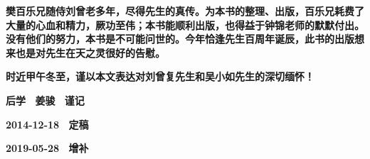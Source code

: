 \textbf{樊百乐兄随侍刘曾老多年，尽得先生的真传。为本书的整理、出版，百乐兄耗费了大量的心血和精力，厥功至伟；本书能顺利出版，也得益于钟锦老师的默默付出。没有他们的努力，本书是不可能问世的。今年恰逢先生百周年诞辰，此书的出版想来也是对先生在天之灵很好的告慰。}

\textbf{时近甲午冬至，谨以本文表达对刘曾复先生和吴小如先生的深切缅怀！}

\begin{flushright}
\textbf{后学~ 姜骏~ 谨记~~~}

\textbf{2014-12-18~ 定稿~}

\textbf{2019-05-28~ 增补~}
\end{flushright}

